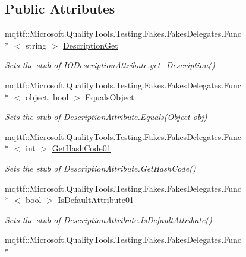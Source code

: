 \subsection*{Public Attributes}
\begin{DoxyCompactItemize}
\item 
mqttf\-::\-Microsoft.\-Quality\-Tools.\-Testing.\-Fakes.\-Fakes\-Delegates.\-Func\\*
$<$ string $>$ \hyperlink{class_system_1_1_i_o_1_1_fakes_1_1_stub_i_o_description_attribute_a97ed6006b32394d72ebf83798a77cc1c}{Description\-Get}
\begin{DoxyCompactList}\small\item\em Sets the stub of I\-O\-Description\-Attribute.\-get\-\_\-\-Description()\end{DoxyCompactList}\item 
mqttf\-::\-Microsoft.\-Quality\-Tools.\-Testing.\-Fakes.\-Fakes\-Delegates.\-Func\\*
$<$ object, bool $>$ \hyperlink{class_system_1_1_i_o_1_1_fakes_1_1_stub_i_o_description_attribute_ae612082b2eba60822fb970043a238bf7}{Equals\-Object}
\begin{DoxyCompactList}\small\item\em Sets the stub of Description\-Attribute.\-Equals(\-Object obj)\end{DoxyCompactList}\item 
mqttf\-::\-Microsoft.\-Quality\-Tools.\-Testing.\-Fakes.\-Fakes\-Delegates.\-Func\\*
$<$ int $>$ \hyperlink{class_system_1_1_i_o_1_1_fakes_1_1_stub_i_o_description_attribute_a4448d6670a9f35f02295f98093131d3a}{Get\-Hash\-Code01}
\begin{DoxyCompactList}\small\item\em Sets the stub of Description\-Attribute.\-Get\-Hash\-Code()\end{DoxyCompactList}\item 
mqttf\-::\-Microsoft.\-Quality\-Tools.\-Testing.\-Fakes.\-Fakes\-Delegates.\-Func\\*
$<$ bool $>$ \hyperlink{class_system_1_1_i_o_1_1_fakes_1_1_stub_i_o_description_attribute_a4b981c8c5c2dde8dcc3d358372ed7149}{Is\-Default\-Attribute01}
\begin{DoxyCompactList}\small\item\em Sets the stub of Description\-Attribute.\-Is\-Default\-Attribute()\end{DoxyCompactList}\item 
mqttf\-::\-Microsoft.\-Quality\-Tools.\-Testing.\-Fakes.\-Fakes\-Delegates.\-Func\\*

\end{DoxyCompactItemize}
